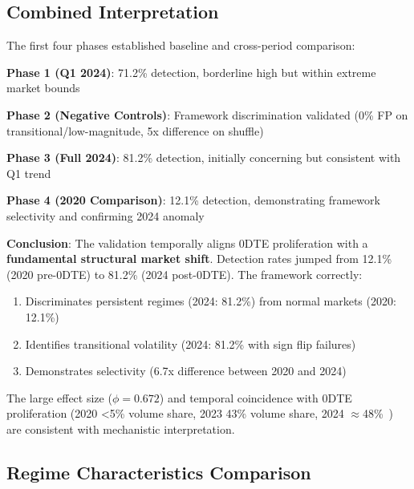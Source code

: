\subsection{Combined Interpretation}

\vspace{0.2cm}

The first four phases established baseline and cross-period comparison:

\vspace{0.2cm}

\noindent\textbf{Phase 1 (Q1 2024)}: 71.2\% detection, borderline high but within extreme market bounds

\vspace{0.1cm}

\noindent\textbf{Phase 2 (Negative Controls)}: Framework discrimination validated (0\% FP on transitional/low-magnitude, 5x difference on shuffle)

\vspace{0.1cm}

\noindent\textbf{Phase 3 (Full 2024)}: 81.2\% detection, initially concerning but consistent with Q1 trend

\vspace{0.1cm}

\noindent\textbf{Phase 4 (2020 Comparison)}: 12.1\% detection, demonstrating framework selectivity and confirming 2024 anomaly

\vspace{0.1cm}

\noindent\textbf{Conclusion}: The validation temporally aligns 0DTE proliferation with a \textbf{fundamental structural market shift}. Detection rates jumped from 12.1\% (2020 pre-0DTE) to 81.2\% (2024 post-0DTE). The framework correctly:
\begin{enumerate}
\item Discriminates persistent regimes (2024: 81.2\%) from normal markets (2020: 12.1\%)
\item Identifies transitional volatility (2024: 81.2\% with sign flip failures)
\item Demonstrates selectivity (6.7x difference between 2020 and 2024)
\end{enumerate}

The large effect size ($\phi = 0.672$) and temporal coincidence with 0DTE proliferation (2020 <5\% volume share, 2023 43\% volume share, 2024 $\approx$48\%~\citep{cboe2024zero}) are consistent with mechanistic interpretation.

\subsection{Regime Characteristics Comparison}

